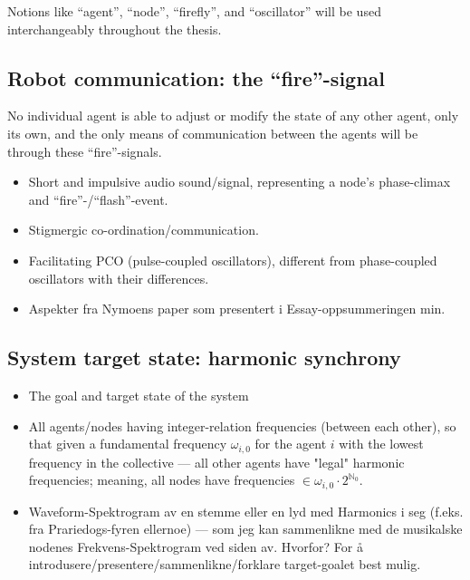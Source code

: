 		Notions like ``agent'', ``node'', ``firefly'', and ``oscillator'' will be used interchangeably throughout the thesis.


	\subsection{Robot communication: the ``fire''-signal}
	\label{subsec:fire_signal}
	
	No individual agent is able to adjust or modify the state of any other agent, only its own, and the only means of communication between the agents will be through these ``fire''-signals.
	
		\begin{itemize}
			\item Short and impulsive audio sound/signal, representing a node's phase-climax and ``fire''-/``flash''-event.
			\item Stigmergic co-ordination/communication.
			\item Facilitating PCO (pulse-coupled oscillators), different from phase-coupled oscillators with their differences.
			\item Aspekter fra Nymoens paper som presentert i Essay-oppsummeringen min.
		\end{itemize}
	

	\subsection{System target state: harmonic synchrony}
	\label{subsec:harmonic_synchrony}
		\begin{itemize}
			\item The goal and target state of the system
			\item All agents/nodes having integer-relation frequencies (between each other), so that given a fundamental frequency $\omega_{i,0}$ for the agent $i$ with the lowest frequency in the collective — all other agents have "legal" harmonic frequencies; meaning, all nodes have frequencies $\in \omega_{i,0} \cdot 2^{\mathbb{N}_0}$.
			\item Waveform-Spektrogram av en stemme eller en lyd med Harmonics i seg (f.eks. fra Prariedogs-fyren ellernoe) — som jeg kan sammenlikne med de musikalske nodenes Frekvens-Spektrogram ved siden av. Hvorfor? For å introdusere/presentere/sammenlikne/forklare target-goalet best mulig.
		\end{itemize}
	
